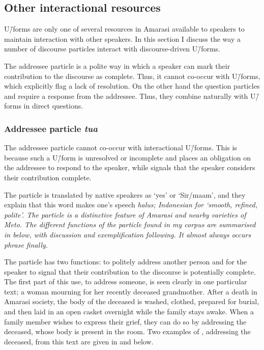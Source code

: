 \subsection{Other interactional resources}\label{sec:OthIntRes}
U\=/forms are only one of several resources in Amarasi
available to speakers to maintain interaction with other speakers.
In this section I discuss the way a number of discourse particles
interact with discourse-driven U\=/forms.

The addressee particle  is a polite way
in which a speaker can mark their contribution to the discourse as complete.
Thus, it cannot co-occur with U\=/forms, which explicitly flag a lack of resolution.
On the other hand the question particles  and 
require a response from the addressee.
Thus, they combine naturally with U\=/forms in direct questions.

\subsubsection{Addressee particle \it{tua}}\label{sec:AddParTua}
The addressee particle  cannot co-occur with interactional U\=/forms.
This is because such a U\=/form is unresolved or incomplete and
places an obligation on the addressee to respond to the speaker,
while  signals that the speaker considers their contribution complete.

The particle  is translated by native speakers as `yes' or `Sir/maam',
and they explain that this word makes one's speech \it{halus};
Indonesian for `smooth, refined, polite'.
The particle  is a distinctive feature
of Amarasi and nearby varieties of Meto.
The different functions of the particle 
found in my corpus are summarised in  below,
with discussion and exemplification following.
It almost always occurs phrase finally.

\begin{exe}
	\label{ex:UseTua}
		\begin{xlist}
		\end{xlist}
\end{exe}

The particle  has two functions: to politely address
another person and for the speaker to signal
that their contribution to the discourse is potentially complete.
The first part of this use, to address someone,
is seen clearly in one particular text;
a woman mourning for her recently deceased grandmother.
After a death in Amarasi society, the body of the deceased is washed, clothed,
prepared for burial, and then laid in an open casket overnight while the family stays awake.
When a family member wishes to express their grief,
they can do so by addressing the deceased, whose body is present in the room.
Two examples of , addressing the deceased, from this text
are given in  and  below.

